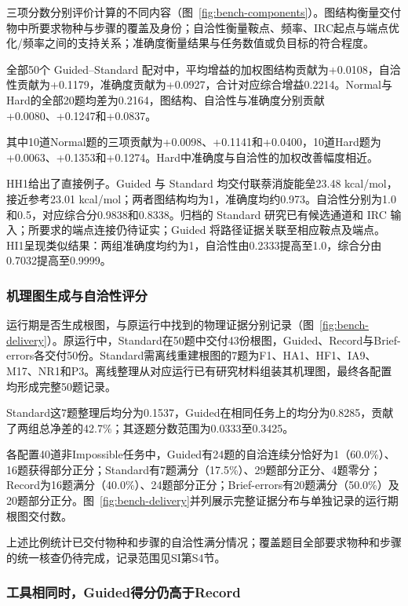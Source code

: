 三项分数分别评价计算的不同内容（图~\ref{fig:bench-components}）。图结构衡量交付物中所要求物种与步骤的覆盖及身份；自洽性衡量鞍点、频率、IRC起点与端点优化/频率之间的支持关系；准确度衡量结果与任务数值或负目标的符合程度。

全部50个 Guided--Standard 配对中，平均增益的加权图结构贡献为+0.0108，自洽性贡献为+0.1179，准确度贡献为+0.0927，合计对应综合增益0.2214。Normal与Hard的全部20题均差为0.2164，图结构、自洽性与准确度分别贡献+0.0080、+0.1247和+0.0837。

其中10道Normal题的三项贡献为+0.0098、+0.1141和+0.0400，10道Hard题为+0.0063、+0.1353和+0.1274。Hard中准确度与自洽性的加权改善幅度相近。

HH1给出了直接例子。Guided 与 Standard 均交付联萘消旋能垒23.48 kcal/mol，接近参考23.01 kcal/mol；两者图结构均为1，准确度均约0.973。自洽性分别为1.0和0.5，对应综合分0.9838和0.8338。归档的 Standard 研究已有候选通道和 IRC 输入；所要求的端点连接仍待证实；Guided 将路径证据关联至相应鞍点及端点。HI1呈现类似结果：两组准确度均约为1，自洽性由0.2333提高至1.0，综合分由0.7032提高至0.9999。

\subsubsection{机理图生成与自洽性评分}

运行期是否生成根图，与原运行中找到的物理证据分别记录（图~\ref{fig:bench-delivery}）。原运行中，Standard在50题中交付43份根图，Guided、Record与Brief-errors各交付50份。Standard需离线重建根图的7题为F1、HA1、HF1、IA9、M17、NR1和P3。离线整理从对应运行已有研究材料组装其机理图，最终各配置均形成完整50题记录。

Standard这7题整理后均分为0.1537，Guided在相同任务上的均分为0.8285，贡献了两组总净差的42.7\%；其逐题分数范围为0.0333至0.3425。

各配置40道非Impossible任务中，Guided有24题的自洽连续分恰好为1（60.0\%）、16题获得部分正分；Standard有7题满分（17.5\%）、29题部分正分、4题零分；Record为16题满分（40.0\%）、24题部分正分；Brief-errors有20题满分（50.0\%）及20题部分正分。图~\ref{fig:bench-delivery}并列展示完整证据分布与单独记录的运行期根图交付数。

上述比例统计已交付物种和步骤的自洽性满分情况；覆盖题目全部要求物种和步骤的统一核查仍待完成，记录范围见SI第S4节。

\subsubsection{工具相同时，Guided得分仍高于Record}

